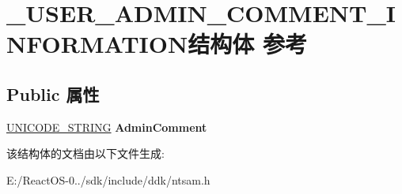 \hypertarget{struct___u_s_e_r___a_d_m_i_n___c_o_m_m_e_n_t___i_n_f_o_r_m_a_t_i_o_n}{}\section{\+\_\+\+U\+S\+E\+R\+\_\+\+A\+D\+M\+I\+N\+\_\+\+C\+O\+M\+M\+E\+N\+T\+\_\+\+I\+N\+F\+O\+R\+M\+A\+T\+I\+O\+N结构体 参考}
\label{struct___u_s_e_r___a_d_m_i_n___c_o_m_m_e_n_t___i_n_f_o_r_m_a_t_i_o_n}
\subsection*{Public 属性}
\begin{DoxyCompactItemize}
\item 
\mbox{\label{struct___u_s_e_r___a_d_m_i_n___c_o_m_m_e_n_t___i_n_f_o_r_m_a_t_i_o_n_a48079f35c76d3a4cac9899a13c5d933d}} 
\hyperlink{struct___u_n_i_c_o_d_e___s_t_r_i_n_g}{U\+N\+I\+C\+O\+D\+E\+\_\+\+S\+T\+R\+I\+NG} {\bfseries Admin\+Comment}
\end{DoxyCompactItemize}


该结构体的文档由以下文件生成\+:\begin{DoxyCompactItemize}
\item 
E\+:/\+React\+O\+S-\/0../sdk/include/ddk/ntsam.\+h\end{DoxyCompactItemize}
